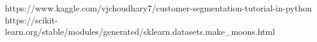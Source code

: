 \documentclass{classrep}
\begin{document}
    \begin{thebibliography}{0}
        {https://www.kaggle.com/vjchoudhary7/customer-segmentation-tutorial-in-python}
        {https://scikit-learn.org/stable/modules/generated/sklearn.datasets.make\_moons.html}

    \end{thebibliography}
\end{document}
